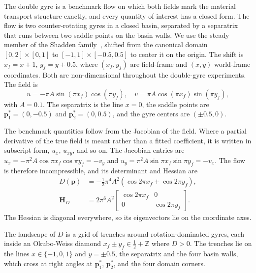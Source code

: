 \documentclass[lettersize,journal]{IEEEtran}
\begin{document}
The double gyre is
a benchmark flow on which both fields mark the material transport structure
exactly, and every
quantity of interest has a closed form. The flow is two counter-rotating gyres in a
closed basin, separated by a separatrix that runs between two saddle points on
the basin walls. We use the steady member of the Shadden
family~\cite{15}, shifted from the canonical domain
$[0,2]\times[0,1]$ to $[-1,1]\times[-0.5,0.5]$ to center it on the origin. The
shift is $x_f = x + 1$, $y_f = y + 0.5$, where $(x_f, y_f)$ are field-frame and
$(x, y)$ world-frame coordinates. Both are non-dimensional throughout the
double-gyre experiments. The field is
\begin{equation}
u = -\pi A \sin(\pi x_f)\cos(\pi y_f), \quad
v = \pi A \cos(\pi x_f)\sin(\pi y_f),
\label{eq:dg_u}
\end{equation}
with $A = 0.1$. The separatrix is the line $x = 0$, the saddle points are
$\mathbf{p}_1^* = (0, -0.5)$ and $\mathbf{p}_2^* = (0, 0.5)$, and the gyre
centers are $(\pm 0.5, 0)$.

The benchmark quantities follow from the Jacobian of the field. Where
a partial derivative of the true field is meant rather than a fitted
coefficient, it is written in subscript form, $u_x$, $u_{xy}$, and so on. The
Jacobian entries are
$u_x = -\pi^2 A \cos\pi x_f \cos\pi y_f = -v_y$ and
$u_y = \pi^2 A \sin\pi x_f \sin\pi y_f = -v_x$. The flow is therefore
incompressible, and its determinant and Hessian are
\begin{equation}
\begin{aligned}
D(\mathbf{p}) &= -\tfrac{1}{2}\pi^4 A^2 \left(\cos 2\pi x_f + \cos 2\pi y_f\right),\\
\mathbf{H}_D &= 2\pi^6 A^2
\begin{bmatrix} \cos 2\pi x_f & 0 \\ 0 & \cos 2\pi y_f \end{bmatrix}.
\end{aligned}
\label{eq:det_analytic_main}
\end{equation}
The Hessian is diagonal everywhere, so its eigenvectors lie on the coordinate
axes.

The landscape of $D$ is a grid of trenches around rotation-dominated gyres,
each inside an Okubo-Weiss diamond $x_f \pm y_f \in \tfrac{1}{2} + \mathbb{Z}$
where $D > 0$. The trenches lie on the lines $x \in \{-1, 0, 1\}$ and
$y = \pm 0.5$, the separatrix and the four basin walls, which cross at right
angles at $\mathbf{p}_1^*$, $\mathbf{p}_2^*$, and the four domain corners.
\end{document}
